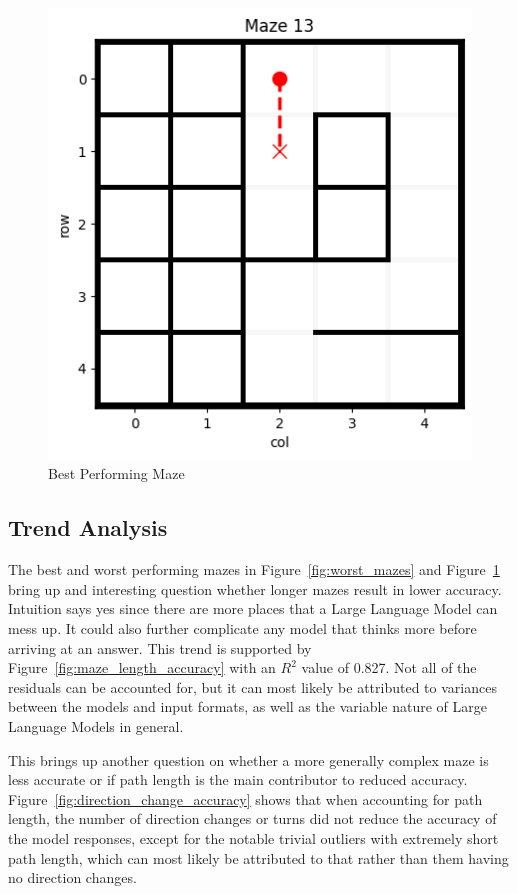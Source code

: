\documentclass[conference]{IEEEtran}
\begin{document}
\begin{figure}[htbp]
  \centering
  \includegraphics[width=0.45\columnwidth]{../mazes/gen_dfs_5x5/figures/maze13.png}
  \caption{Best Performing Maze}
  \label{fig:best_maze}
\end{figure}

\subsection{Trend Analysis}

The best and worst performing mazes in Figure~\ref{fig:worst_mazes} and Figure~\ref{fig:best_maze} bring up and interesting question whether longer mazes result in lower accuracy. Intuition says yes since there are more places that a Large Language Model can mess up. It could also further complicate any model that thinks more before arriving at an answer. This trend is supported by Figure~\ref{fig:maze_length_accuracy} with an $R^2$ value of 0.827. Not all of the residuals can be accounted for, but it can most likely be attributed to variances between the models and input formats, as well as the variable nature of Large Language Models in general.

This brings up another question on whether a more generally complex maze is less accurate or if path length is the main contributor to reduced accuracy. Figure~\ref{fig:direction_change_accuracy} shows that when accounting for path length, the number of direction changes or turns did not reduce the accuracy of the model responses, except for the notable trivial outliers with extremely short path length, which can most likely be attributed to that rather than them having no direction changes.
\end{document}
